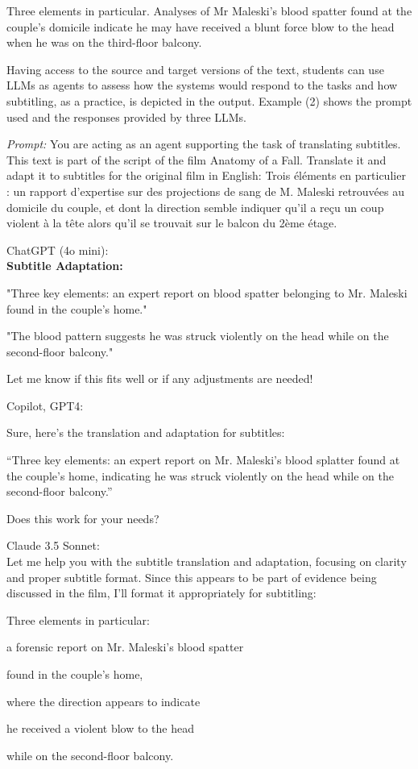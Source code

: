 \documentclass[output=paper]{langscibook}
\begin{document}
  \ttfamily
  {Three elements in particular. Analyses of Mr Maleski’s blood spatter found at the couple’s domicile indicate he may have received a blunt force blow to the head when he was on the third-floor balcony.}
\z
\z

Having access to the source and target versions of the text, students can use LLMs as agents to assess how the systems would respond to the tasks and how subtitling, as a practice, is depicted in the output. Example (2) shows the prompt used and the responses provided by three LLMs.

\ea
\textit{Prompt:} You are acting as an agent supporting the task of translating subtitles. This text is part of the script of the film Anatomy of a Fall. Translate it and adapt it to subtitles for the original film in English: Trois éléments en particulier : un rapport d’expertise sur des projections de sang de M. Maleski retrouvées au domicile du couple, et dont la direction semble indiquer qu’il a reçu un coup violent à la tête alors qu’il se trouvait sur le balcon du 2ème étage.

\ea ChatGPT (4o mini): \\
\ttfamily
\textbf{{Subtitle Adaptation:}}

 {"Three key elements: an expert report on blood spatter belonging to Mr. Maleski found in the couple's home."}

 {"The blood pattern suggests he was struck violently on the head while on the second-floor balcony."}

 {Let me know if this fits well or if any adjustments are needed!}

\ex Copilot, GPT4:\\
\ttfamily

 {Sure, here’s the translation and adaptation for subtitles:}

 {“Three key elements: an expert report on Mr. Maleski’s blood splatter found at the couple’s home, indicating he was struck violently on the head while on the second-floor balcony.”}

 {Does this work for your needs?}

\ex Claude 3.5 Sonnet:\\
\ttfamily
Let  {me help you with the subtitle translation and adaptation, focusing on clarity and proper subtitle format. Since this appears to be part of evidence being discussed in the film, I'll format it appropriately for subtitling:}

{Three elements in particular:

a forensic report on Mr. Maleski's blood spatter

found in the couple's home,

where the direction appears to indicate

he received a violent blow to the head

while on the second-floor balcony.}
\end{document}
